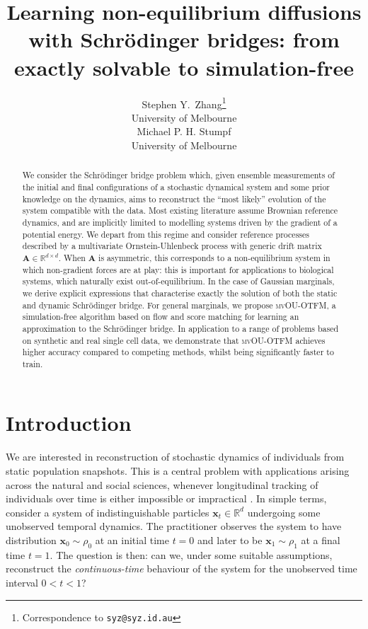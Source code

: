 \documentclass{article}
\title{Learning non-equilibrium diffusions with Schr\"odinger bridges: from exactly solvable to simulation-free}
\author{
  Stephen Y.~Zhang\thanks{Correspondence to \texttt{syz@syz.id.au}} \\
  University of Melbourne\\
  \And
  Michael P. H. Stumpf \\
  University of Melbourne
}
\theoremstyle{newstyle}
\begin{document}
\maketitle


\begin{abstract}
  We consider the Schr\"odinger bridge problem which, given ensemble measurements of the initial and final configurations of a stochastic dynamical system and some prior knowledge on the dynamics, aims to reconstruct the ``most likely'' evolution of the system compatible with the data.
  Most existing literature assume Brownian reference dynamics, and are implicitly limited to modelling systems driven by the gradient of a potential energy.
  We depart from this regime and consider reference processes described by a multivariate Ornstein-Uhlenbeck process with generic drift matrix $\bm{A} \in \mathbb{R}^{d \times d}$.
  When $\bm{A}$ is asymmetric, this corresponds to a non-equilibrium system in which non-gradient forces are at play: this is important for applications to biological systems, which naturally exist out-of-equilibrium.
  In the case of Gaussian marginals, we derive explicit expressions that characterise exactly the solution of both the static and dynamic Schr\"odinger bridge.
  For general marginals, we propose \textsc{mvOU-OTFM}, a simulation-free algorithm based on flow and score matching for learning an approximation to the Schr\"odinger bridge.
  In application to a range of problems based on synthetic and real single cell data, we demonstrate that \textsc{mvOU-OTFM} achieves higher accuracy compared to competing methods, whilst being significantly faster to train. 
\end{abstract}

\section{Introduction}

We are interested in reconstruction of stochastic dynamics of individuals from static population snapshots. This is a central problem with  applications arising across the natural and social sciences, whenever longitudinal tracking of individuals over time is either impossible or impractical \cite{weinreb2018fundamental, muzellec2017tsallis, stuart2020inverse, schiebinger2019optimal, miles2024inferring, abel2014quantifying}.
In simple terms, consider a system of indistinguishable particles $\bm{x}_t \in \mathbb{R}^d$ undergoing some unobserved temporal dynamics. The practitioner observes the system to have distribution $\bm{x}_0 \sim \rho_0$ at an initial time $t = 0$ and later to be $\bm{x}_1 \sim \rho_1$ at a final time $t = 1$. The question is then: can we, under some suitable assumptions, reconstruct the \emph{continuous-time} behaviour of the system for the unobserved time interval $0 < t < 1$?
\end{document}

